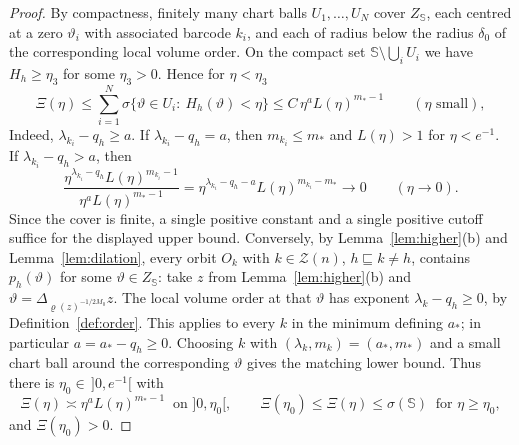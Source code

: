 \documentclass[11pt,a4paper]{article}
\theoremstyle{definition}
\theoremstyle{remark}
\numberwithin{equation}{section}
\newcommand{\Zb}{\mathcal Z}
\begin{document}
\begin{proof}
By compactness, finitely many chart balls $U_1,\dots,U_N$ cover $Z_{\mathbb S}$, each centred at a zero $\vartheta_i$ with associated barcode $k_i$, and each of radius below the radius $\delta_0$ of the corresponding local volume order. On the compact set $\mathbb S\setminus\bigcup_iU_i$ we have $H_h\ge\eta_3$ for some $\eta_3>0$. Hence for $\eta<\eta_3$
\[
\Xi(\eta)\le\sum_{i=1}^N\sigma\{\vartheta\in U_i:\ H_h(\vartheta)<\eta\}\le C\,\eta^{a}L(\eta)^{m_*-1}\qquad(\eta\text{ small}),
\]
Indeed, $\lambda_{k_i}-q_h\ge a$. If $\lambda_{k_i}-q_h=a$, then $m_{k_i}\le m_*$ and $L(\eta)>1$ for $\eta<e^{-1}$. If $\lambda_{k_i}-q_h>a$, then
\[
\frac{\eta^{\lambda_{k_i}-q_h}L(\eta)^{m_{k_i}-1}}{\eta^aL(\eta)^{m_*-1}}=\eta^{\lambda_{k_i}-q_h-a}L(\eta)^{m_{k_i}-m_*}\longrightarrow0\qquad(\eta\to0).
\]
Since the cover is finite, a single positive constant and a single positive cutoff suffice for the displayed upper bound. Conversely, by Lemma~\ref{lem:higher}(b) and Lemma~\ref{lem:dilation}, every orbit $O_k$ with $k\in\Zb(n)$, $h\sqsubseteq k\neq h$, contains $p_h(\vartheta)$ for some $\vartheta\in Z_{\mathbb S}$: take $z$ from Lemma~\ref{lem:higher}(b) and $\vartheta=\Delta_{\varrho(z)^{-1/2M_0}}z$. The local volume order at that $\vartheta$ has exponent $\lambda_k-q_h\ge0$, by Definition~\ref{def:order}. This applies to every $k$ in the minimum defining $a_*$; in particular $a=a_*-q_h\ge0$. Choosing $k$ with $(\lambda_k,m_k)=(a_*,m_*)$ and a small chart ball around the corresponding $\vartheta$ gives the matching lower bound. Thus there is $\eta_0\in\,]0,e^{-1}[$ with
\[
\Xi(\eta)\asymp\eta^aL(\eta)^{m_*-1}\ \text{ on }]0,\eta_0[,\qquad\Xi(\eta_0)\le\Xi(\eta)\le\sigma(\mathbb S)\ \text{ for }\eta\ge\eta_0,
\]
and $\Xi(\eta_0)>0$.


\end{proof}
\end{document}
